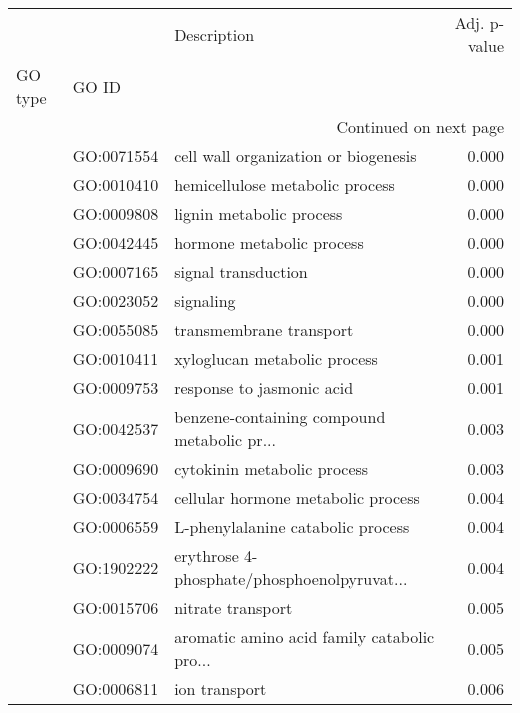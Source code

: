 \begin{longtable}{lllr}
\toprule
   &            &                                  Description &  Adj. p-value \\
GO type & GO ID &                                              &               \\
\midrule
\endhead
\midrule
\multicolumn{4}{r}{{Continued on next page}} \\
\midrule
\endfoot

\bottomrule
\endlastfoot
\multirow{72}{*}{BP} & GO:0071554 &         cell wall organization or biogenesis &         0.000 \\
   & GO:0010410 &              hemicellulose metabolic process &         0.000 \\
   & GO:0009808 &                     lignin metabolic process &         0.000 \\
   & GO:0042445 &                    hormone metabolic process &         0.000 \\
   & GO:0007165 &                          signal transduction &         0.000 \\
   & GO:0023052 &                                    signaling &         0.000 \\
   & GO:0055085 &                      transmembrane transport &         0.000 \\
   & GO:0010411 &                 xyloglucan metabolic process &         0.001 \\
   & GO:0009753 &                    response to jasmonic acid &         0.001 \\
   & GO:0042537 &  benzene-containing compound metabolic pr... &         0.003 \\
   & GO:0009690 &                  cytokinin metabolic process &         0.003 \\
   & GO:0034754 &           cellular hormone metabolic process &         0.004 \\
   & GO:0006559 &            L-phenylalanine catabolic process &         0.004 \\
   & GO:1902222 &  erythrose 4-phosphate/phosphoenolpyruvat... &         0.004 \\
   & GO:0015706 &                            nitrate transport &         0.005 \\
   & GO:0009074 &  aromatic amino acid family catabolic pro... &         0.005 \\
   & GO:0006811 &                                ion transport &         0.006 \\

\end{longtable}
